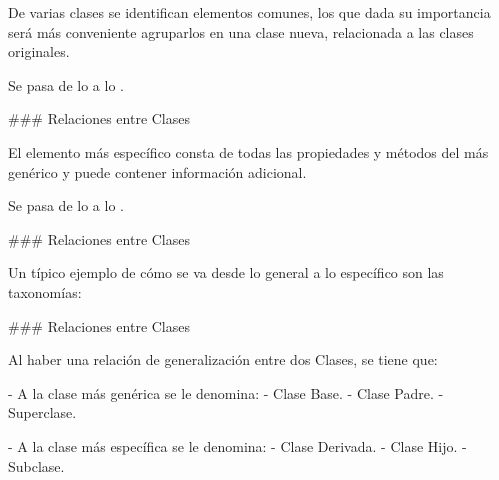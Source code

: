 \newline

De varias clases se identifican elementos comunes, los que dada su importancia será
más conveniente agruparlos en una clase nueva, relacionada a las clases originales.

\vspace{-1em}
\begin{center}\hspace{60mm}\begin{customRoundedBox}{}
\centering Se pasa de lo  a lo .
\end{customRoundedBox}\end{center}

### Relaciones entre Clases

\newline

\newline

El elemento más específico consta de todas las propiedades y métodos del más
genérico y puede contener información adicional.

\vspace{-1em}
\begin{center}\hspace{60mm}\begin{customRoundedBox}{}
\centering Se pasa de lo  a lo .
\end{customRoundedBox}\end{center}


### Relaciones entre Clases

\newline

Un típico ejemplo de cómo se va desde lo general a lo específico son las taxonomías:\newline

\taxonomyOrg


### Relaciones entre Clases

\newline

Al haber una relación de generalización entre dos Clases, se tiene que:

- A la clase más genérica se le denomina:
    - Clase Base.
    - Clase Padre.
    - Superclase.

- A la clase más específica se le denomina:
    - Clase Derivada.
    - Clase Hijo.
    - Subclase.

